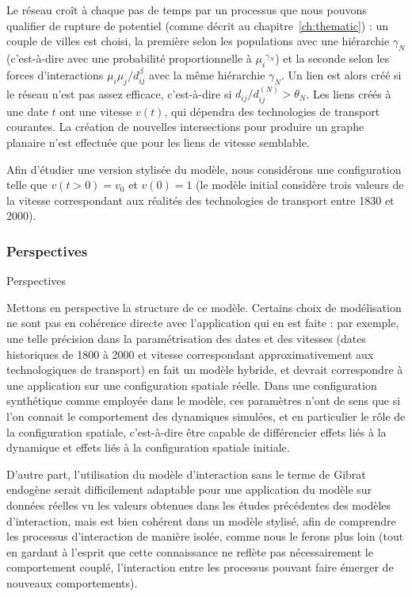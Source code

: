 
Le réseau croît à chaque pas de temps par un processus que nous pouvons qualifier de rupture de potentiel (comme décrit au chapitre~\ref{ch:thematic}) : un couple de villes est choisi, la première selon les populations avec une hiérarchie $\gamma_N$ (c'est-à-dire avec une probabilité proportionnelle à ${\mu_i}^{\gamma_N}$) et la seconde selon les forces d'interactions $\mu_i \mu_j / d_{ij}^\beta$ avec la même hiérarchie $\gamma_N$. Un lien est alors créé si le réseau n'est pas assez efficace, c'est-à-dire si $d_{ij}/d^{(N)}_{ij}> \theta_N$. Les liens créés à une date $t$ ont une vitesse $v(t)$, qui dépendra des technologies de transport courantes. La création de nouvelles intersections pour produire un graphe planaire n'est effectuée que pour les liens de vitesse semblable.

Afin d'étudier une version stylisée du modèle, nous considérons une configuration telle que $v(t > 0) = v_0$ et $v(0) = 1$ (le modèle initial considère trois valeurs de la vitesse correspondant aux réalités des technologies de transport entre 1830 et 2000).


\subsubsection{Perspectives}{Perspectives}

Mettons en perspective la structure de ce modèle. Certains choix de modélisation ne sont pas en cohérence directe avec l'application qui en est faite : par exemple, une telle précision dans la paramétrisation des dates et des vitesses (dates historiques de 1800 à 2000 et vitesse correspondant approximativement aux technologiques de transport) en fait un modèle hybride, et devrait correspondre à une application sur une configuration spatiale réelle. Dans une configuration synthétique comme employée dans le modèle, ces paramètres n'ont de sens que si l'on connait le comportement des dynamiques simulées, et en particulier le rôle de la configuration spatiale, c'est-à-dire être capable de différencier effets liés à la dynamique et effets liés à la configuration spatiale initiale. 

D'autre part, l'utilisation du modèle d'interaction sans le terme de Gibrat endogène serait difficilement adaptable pour une application du modèle sur données réelles vu les valeurs obtenues dans les études précédentes des modèles d'interaction, mais est bien cohérent dans un modèle stylisé, afin de comprendre les processus d'interaction de manière isolée, comme nous le ferons plus loin (tout en gardant à l'esprit que cette connaissance ne reflète pas nécessairement le comportement couplé, l'interaction entre les processus pouvant faire émerger de nouveaux comportements).


